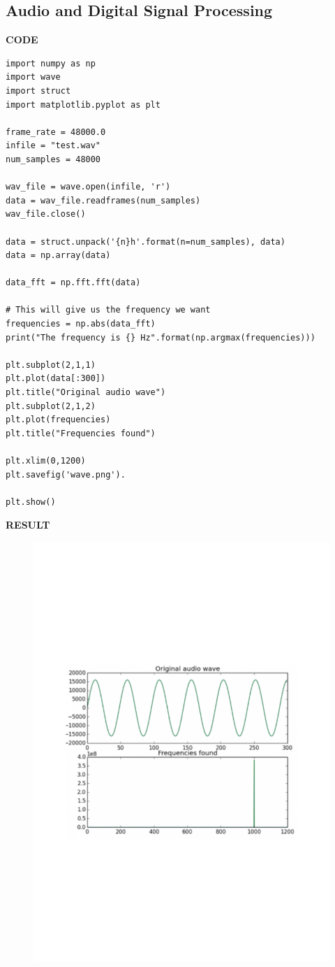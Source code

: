 \documentclass[14pt,a4paper]{article}
\begin{document}
\subsection{Audio and Digital Signal Processing}
\par 
\textbf{CODE}
\begin{lstlisting}
import numpy as np
import wave
import struct
import matplotlib.pyplot as plt

frame_rate = 48000.0
infile = "test.wav"
num_samples = 48000

wav_file = wave.open(infile, 'r')
data = wav_file.readframes(num_samples)
wav_file.close()

data = struct.unpack('{n}h'.format(n=num_samples), data)
data = np.array(data)

data_fft = np.fft.fft(data)

# This will give us the frequency we want
frequencies = np.abs(data_fft)
print("The frequency is {} Hz".format(np.argmax(frequencies)))

plt.subplot(2,1,1)
plt.plot(data[:300])
plt.title("Original audio wave")
plt.subplot(2,1,2)
plt.plot(frequencies)
plt.title("Frequencies found")

plt.xlim(0,1200)
plt.savefig('wave.png').

plt.show()
\end{lstlisting}
\par \textbf{RESULT}
\begin{figure}[h]
\centering
\includegraphics[scale=0.6,angle=0]{pythonDSP.pdf}
\end{figure}
\end{document}
